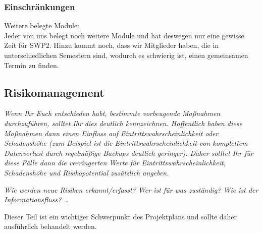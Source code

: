 \documentclass[fontsize=12pt,paper=a4,twoside]{scrartcl}
\begin{document}
\subsubsection{Einschränkungen}
\underline{Weitere belegte Module:} \\
Jeder von uns belegt noch weitere Module und hat deswegen nur eine gewisse Zeit für SWP2. Hinzu kommt noch, dass wir Mitglieder haben, die in unterschiedlichen Semestern sind, wodurch es schwierig ist, einen gemeinsamen Termin zu finden. \\

\subsection{Risikomanagement}\label{riskmanagement}

{\em Wenn Ihr Euch entschieden habt, bestimmte vorbeugende Maßnahmen 
     durchzuführen, solltet Ihr dies deutlich kennzeichnen. Hoffentlich
     haben diese Maßnahmen dann einen Einfluss auf Eintrittswahrscheinlichkeit oder Schadenshöhe (zum Beispiel
     ist die Eintrittswahrscheinlichkeit von komplettem Datenverlust durch regelmäßige Backups deutlich 
     geringer). Daher solltet Ihr für diese Fälle dann die verringerten Werte für Eintrittswahrscheinlichkeit, 
     Schadenshöhe und Risikopotential zusätzlich angeben. }

{\em Wie werden neue Risiken erkannt/erfasst? Wer ist für was
  zuständig? Wie ist der Informationsfluss? \ldots 

Dieser Teil ist ein
  wichtiger Schwerpunkt des Projektplans und sollte daher ausführlich
  behandelt werden.}
\end{document}
